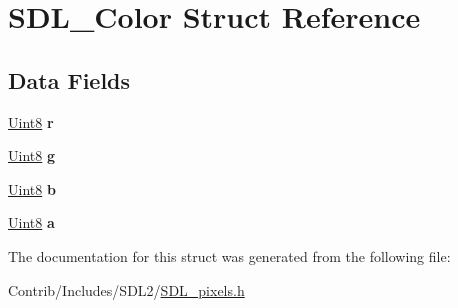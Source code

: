 \hypertarget{struct_s_d_l___color}{}\section{S\+D\+L\+\_\+\+Color Struct Reference}
\label{struct_s_d_l___color}
\subsection*{Data Fields}
\begin{DoxyCompactItemize}
\item 
\hyperlink{_s_d_l__stdinc_8h_a2944638813a090aa23e62f4da842c3e2}{Uint8} {\bfseries r}\hypertarget{struct_s_d_l___color_a91b464c8eae5ece8465e150e16086acd}{}\label{struct_s_d_l___color_a91b464c8eae5ece8465e150e16086acd}

\item 
\hyperlink{_s_d_l__stdinc_8h_a2944638813a090aa23e62f4da842c3e2}{Uint8} {\bfseries g}\hypertarget{struct_s_d_l___color_ab4c6f97b95a6d0a8058a62eab9c78c43}{}\label{struct_s_d_l___color_ab4c6f97b95a6d0a8058a62eab9c78c43}

\item 
\hyperlink{_s_d_l__stdinc_8h_a2944638813a090aa23e62f4da842c3e2}{Uint8} {\bfseries b}\hypertarget{struct_s_d_l___color_a3d03a0372246e40434fc7a8a928c1e92}{}\label{struct_s_d_l___color_a3d03a0372246e40434fc7a8a928c1e92}

\item 
\hyperlink{_s_d_l__stdinc_8h_a2944638813a090aa23e62f4da842c3e2}{Uint8} {\bfseries a}\hypertarget{struct_s_d_l___color_ababb728b2453c31cab11523817407956}{}\label{struct_s_d_l___color_ababb728b2453c31cab11523817407956}

\end{DoxyCompactItemize}


The documentation for this struct was generated from the following file\+:\begin{DoxyCompactItemize}
\item 
Contrib/\+Includes/\+S\+D\+L2/\hyperlink{_s_d_l__pixels_8h}{S\+D\+L\+\_\+pixels.\+h}\end{DoxyCompactItemize}
